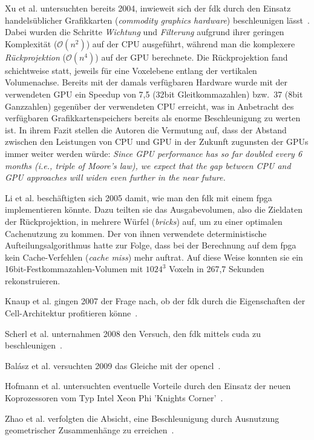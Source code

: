 Xu et al. untersuchten bereits 2004, inwieweit sich der \gls{fdk} durch den Einsatz handelsüblicher Grafikkarten
(\textit{commodity graphics hardware}) beschleunigen lässt~\cite{xumuell}. Dabei wurden die Schritte \textit{Wichtung}
und \textit{Filterung} aufgrund ihrer geringen Komplexität ($\mathcal{O}(n^2)$) auf der CPU ausgeführt, während man die
komplexere \textit{Rückprojektion} ($\mathcal{O}(n^4)$) auf der GPU berechnete. Die Rückprojektion fand schichtweise
statt, jeweils für eine Voxelebene entlang der vertikalen Volumenachse. Bereits mit der damals verfügbaren Hardware
wurde mit der verwendeten GPU ein Speedup von 7,5 (32bit Gleitkommazahlen) bzw.\ 37 (8bit Ganzzahlen) gegenüber der
verwendeten CPU erreicht, was in Anbetracht des verfügbaren Grafikkartenspeichers bereits als enorme Beschleunigung zu
werten ist. In ihrem Fazit stellen die Autoren die Vermutung auf, dass der Abstand zwischen den Leistungen von CPU und
GPU in der Zukunft zugunsten der GPUs immer weiter werden würde: \textit{Since GPU performance has so far doubled every
6 months (i.e., triple of Moore's law), we expect that the gap between CPU and GPU approaches will widen even further in
the near future.}

Li et al. beschäftigten sich 2005 damit, wie man den \gls{fdk} mit einem \gls{fpga} implementieren könnte. Dazu teilten sie
das Ausgabevolumen, also die Zieldaten der Rückprojektion, in mehrere Würfel (\textit{bricks}) auf, um zu einer
optimalen Cachenutzung zu kommen. Der von ihnen verwendete deterministische Aufteilungsalgorithmus hatte zur Folge, dass
bei der Berechnung auf dem \gls{fpga} kein Cache-Verfehlen (\textit{cache miss}) mehr auftrat. Auf diese Weise konnten
sie ein 16bit-Festkommazahlen-Volumen mit $1024^3$ Voxeln in 267,7 Sekunden rekonstruieren.

Knaup et al. gingen 2007 der Frage nach, ob der \gls{fdk} durch die Eigenschaften der Cell-Architektur profitieren
könne~\cite{knaupsteck}.

Scherl et al. unternahmen 2008 den Versuch, den \gls{fdk} mittels \gls{cuda} zu beschleunigen~\cite{scherlkeck}.

Balász et al. versuchten 2009 das Gleiche mit der \gls{opencl}~\cite{balgab}.

Hofmann et al. untersuchten eventuelle Vorteile durch den Einsatz der neuen Koprozessoren vom Typ Intel{\textregistered}
Xeon Phi{\texttrademark} 'Knights Corner'~\cite{hoftrei}.

Zhao et al. verfolgten die Absicht, eine Beschleunigung durch Ausnutzung geometrischer Zusammenhänge zu
erreichen~\cite{zhao}.

